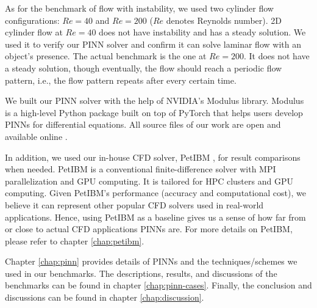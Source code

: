 As for the benchmark of flow with instability, we used two cylinder flow configurations: $Re=40$ and $Re=200$ ($Re$ denotes Reynolds number).
2D cylinder flow at $Re=40$ does not have instability and has a steady solution.
We used it to verify our PINN solver and confirm it can solve laminar flow with an object's presence.
The actual benchmark is the one at $Re=200$.
It does not have a steady solution, though eventually, the flow should reach a periodic flow pattern, i.e., the flow pattern repeats after every certain time.

We built our PINN solver with the help of NVIDIA's Modulus library.
Modulus is a high-level Python package built on top of PyTorch that helps users develop PINNs for differential equations.
All source files of our work are open and available online \cite{chuang_dissertation_nodate}.

In addition, we used our in-house CFD solver, PetIBM \cite{chuang_petibm:_2018}, for result comparisons when needed.
PetIBM is a conventional finite-difference solver with MPI parallelization and GPU computing.
It is tailored for HPC clusters and GPU computing.
Given PetIBM's performance (accuracy and computational cost), we believe it can represent other popular CFD solvers used in real-world applications.
Hence, using PetIBM as a baseline gives us a sense of how far from or close to actual CFD applications PINNs are.
For more details on PetIBM, please refer to chapter \ref{chap:petibm}.

Chapter \ref{chap:pinn} provides details of PINNs and the techniques/schemes we used in our benchmarks.
The descriptions, results, and discussions of the benchmarks can be found in chapter \ref{chap:pinn-cases}.
Finally, the conclusion and discussions can be found in chapter \ref{chap:discussion}.

